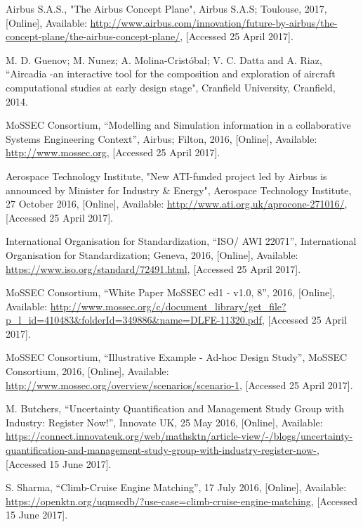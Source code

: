 \documentclass[11pt]{meetingmins}
\begin{document}
\begin{thebibliography}{99}

	Airbus S.A.S.,
	"The Airbus Concept Plane",
	Airbus S.A.S; Toulouse,
	2017,
	[Online],
	Available: \url{http://www.airbus.com/innovation/future-by-airbus/the-concept-plane/the-airbus-concept-plane/},
	[Accessed 25 April 2017].

	M. D. Guenov; M. Nunez; A. Molina-Cristóbal; V. C. Datta and A. Riaz,
	“Aircadia -an interactive tool for the composition and exploration of aircraft computational studies at early design stage",
	Cranfield University,
	Cranfield,
	2014.

	MoSSEC Consortium,
	“Modelling and Simulation information in a collaborative Systems Engineering Context”,
	Airbus; Filton,
	2016,
	[Online],
	Available: \url{http://www.mossec.org},
	[Accessed 25 April 2017].

	Aerospace Technology Institute,
	"New ATI-funded project led by Airbus is announced by Minister for Industry \& Energy",
	Aerospace Technology Institute, 
	27 October 2016,
	[Online],
	Available: \url{http://www.ati.org.uk/aprocone-271016/},
	[Accessed 25 April 2017].

	International Organisation for Standardization, 
	“ISO/ AWI 22071”, 
	International Organisation for Standardization; Geneva,
	2016, 
	[Online], 
	Available: \url{https://www.iso.org/standard/72491.html}, 
	[Accessed 25 April 2017].

	MoSSEC Consortium, 
	“White Paper MoSSEC ed1 - v1.0, 8”, 
	2016, 
	[Online], 
	Available: \url{http://www.mossec.org/c/document_library/get_file?p_l_id=410483&folderId=349886&name=DLFE-11320.pdf}, 
	[Accessed 25 April 2017].

	MoSSEC Consortium, “Illustrative Example - Ad-hoc Design Study”, MoSSEC Consortium, 2016, [Online], Available: \url{http://www.mossec.org/overview/scenarios/scenario-1}, [Accessed 25 April 2017].

	M. Butchers, “Uncertainty Quantification and Management Study Group with Industry: Register Now!”, Innovate UK, 25 May 2016, [Online], Available: \url{https://connect.innovateuk.org/web/mathsktn/article-view/-/blogs/uncertainty-quantification-and-management-study-group-with-industry-register-now-}, [Accessed 15 June 2017].

	S. Sharma, “Climb-Cruise Engine Matching”, 17 July 2016, [Online], Available: \url{https://openktn.org/uqmscdb/?use-case=climb-cruise-engine-matching}, [Accessed 15 June 2017].


\end{thebibliography}
\end{document}
